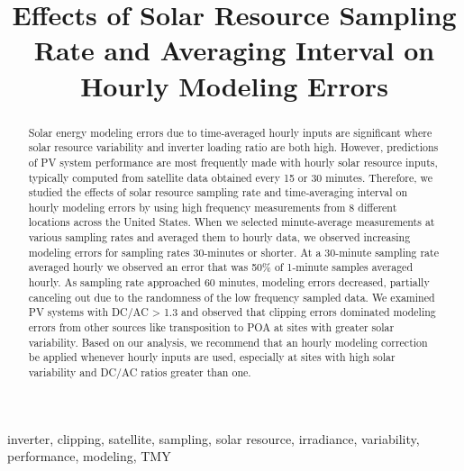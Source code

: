 \documentclass[conference]{IEEEtran}
\begin{document}
\title{Effects of Solar Resource Sampling Rate and Averaging Interval on  Hourly Modeling Errors}

\author{
}

\maketitle

\begin{abstract}
Solar energy modeling errors due to time-averaged hourly inputs are significant where solar resource variability and inverter loading ratio are both high. However, predictions of PV system performance are most frequently made with hourly solar resource inputs, typically computed from satellite data obtained every 15 or 30 minutes. Therefore, we studied the effects of solar resource sampling rate and time-averaging interval on hourly modeling errors by using high frequency measurements from 8 different locations across the United States. When we selected minute-average measurements at various sampling rates and averaged them to hourly data, we observed increasing modeling errors for sampling rates 30-minutes or shorter. At a 30-minute sampling rate averaged hourly we observed an error that was 50\% of 1-minute samples averaged hourly. As sampling rate approached 60 minutes, modeling errors decreased, partially canceling out due to the randomness of the low frequency sampled data. We examined PV systems with DC/AC > 1.3 and observed that clipping errors dominated modeling errors from other sources like transposition to POA at sites with greater solar variability. Based on our analysis, we recommend that an hourly modeling correction be applied whenever hourly inputs are used, especially at sites with high solar variability and DC/AC ratios greater than one.
\end{abstract}

\begin{IEEEkeywords}
inverter, clipping, satellite, sampling, solar resource, irradiance, variability, performance, modeling, TMY
\end{IEEEkeywords}
\end{document}

